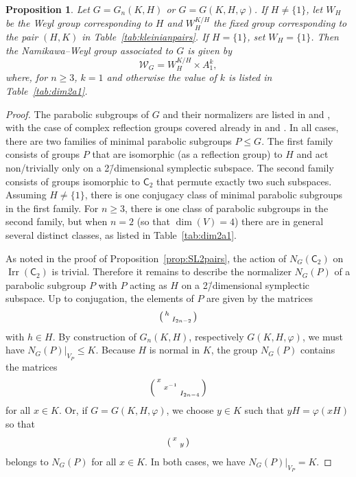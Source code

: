 \documentclass[a4paper]{amsart}
\theoremstyle{plain}
\newtheorem{proposition}[theorem]{Proposition}
\theoremstyle{definition}
\theoremstyle{remark}
\DeclareMathOperator{\Irr}{Irr}
\renewcommand{\phi}{\varphi}
\begin{document}
\begin{proposition}
  \label{prop:imprim}
  Let \(G = G_n(K, H)\) or \(G = G(K, H, \phi)\).
  If \(H\neq \{1\}\), let \(W_H\) be the Weyl group corresponding to \(H\) and \(W_H^{K/H}\) the fixed group corresponding to the pair \((H, K)\) in Table~\ref{tab:kleinianpairs}.
  If \(H = \{1\}\), set \(W_H = \{1\}\).
  Then the Namikawa--Weyl group associated to \(G\) is given by
  \[
  \mathcal W_G = W_H^{K/H} \times A_1^k,
  \]
  where, for \(n \geqslant 3\), \(k = 1\) and otherwise the value of \(k\) is listed in Table~\ref{tab:dim2a1}.
\end{proposition}
\begin{proof}
  The parabolic subgroups of \(G\) and their normalizers are listed in \cite[Sect.~4]{GRS25} and \cite[Sect.~3]{RS26}, with the case of complex reflection groups covered already in \cite[Sect.~6.1]{OT92} and \cite{MT18}.
  In all cases, there are two families of minimal parabolic subgroups \(P\leqslant G\).
  The first family consists of groups \(P\) that are isomorphic (as a reflection group) to \(H\) and act non\-/trivially only on a 2\=/dimensional symplectic subspace.
  The second family consists of groups isomorphic to \(\mathsf C_2\) that permute exactly two such subspaces.
  Assuming \(H\neq \{1\}\), there is one conjugacy class of minimal parabolic subgroups in the first family.
  For \(n \geqslant 3\), there is one class of parabolic subgroups in the second family, but when $n = 2$ (so that $\dim(V) = 4$) there are in general several distinct classes, as listed in Table~\ref{tab:dim2a1}.

  As noted in the proof of Proposition~\ref{prop:SL2pairs}, the action of $N_G(\mathsf C_2)$ on $\Irr(\mathsf C_2)$ is trivial. Therefore it remains to describe the normalizer \(N_G(P)\) of a parabolic subgroup \(P\) with \(P\) acting as \(H\) on a 2\=/dimensional symplectic subspace.
  Up to conjugation, the elements of \(P\) are given by the matrices \[\begin{psmallmatrix} h & \\ & I_{2n - 2} \end{psmallmatrix}\] with \(h\in H\).
  By construction of \(G_n(K, H)\), respectively \(G(K, H, \phi)\), we must have \(N_G(P)|_{V_P} \leqslant K\).
  Because \(H\) is normal in \(K\), the group \(N_G(P)\) contains the matrices \[\begin{psmallmatrix} x & & \\ & x^{-1} & \\ & & I_{2n - 4}\end{psmallmatrix}\]
  for all $x \in K$. Or, if \(G = G(K, H, \phi)\),  we choose $y \in K$ such that $y H = \phi(x H)$ so that \[\begin{psmallmatrix} x & \\ & y\end{psmallmatrix}\] belongs to $N_G(P)$ for all \(x\in K\). In both cases, we have \(N_G(P)|_{V_P} = K\).
\end{proof}
\end{document}
